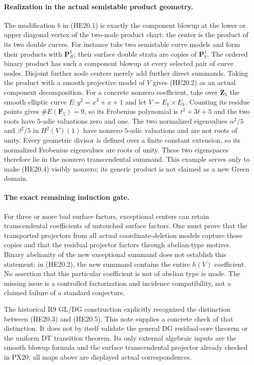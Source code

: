 \paragraph{Realization in the actual semistable product geometry.}
The modification $b$ in (HE20.1) is exactly the component blowup
at the lower or upper diagonal vertex of the two-node product
chart: the center is the product of its two double curves.
For instance take two semistable curve models and form their
products with $\mathbf P^1_R$; their surface double strata
are copies of $\mathbf P^1_k$. The ordered binary product has
such a component blowup at every selected pair of curve nodes.
Disjoint further node centers merely add further direct summands.
Taking the product with a smooth projective model of $V$ gives
(HE20.2) as an actual component decomposition. For a concrete
nonzero coefficient, take over $\mathbf Z_5$ the smooth elliptic
curve $E:y^2=x^3+x+1$ and let $V=E_k\times E_k$. Counting its
residue points gives $\#E(\mathbf F_5)=9$, so its Frobenius
polynomial is $t^2+3t+5$ and the two roots have $5$-adic valuations
zero and one. The two normalized eigenvalues $\alpha^2/5$ and
$\beta^2/5$ in $H^2(V)(1)$ have nonzero $5$-adic valuations and
are not roots of unity. Every geometric divisor is defined over a
finite constant extension, so its normalized Frobenius eigenvalues
are roots of unity. These two eigenspaces therefore lie in the
nonzero transcendental summand. This example serves only to make
(HE20.4) visibly nonzero; its generic product is not claimed as a
new Green domain.

\paragraph{The exact remaining induction gate.}
For three or more bad surface factors, exceptional centers can
retain transcendental coefficients of untouched surface factors.
One must prove that the transported projectors from all actual
coordinate-deletion models capture those copies and that the
residual projector factors through abelian-type motives. Binary
abelianity of the new exceptional summand does not establish this
statement: in (HE20.2), the new summand contains the entire
$h(V)$ coefficient. No assertion that this particular coefficient
is not of abelian type is made. The missing issue is a controlled
factorization and incidence compatibility, not a claimed failure
of a standard conjecture.

The historical R9 GL/DG construction explicitly recognized the
distinction between (HE20.3) and (HE20.5). This note supplies a
concrete check of that distinction. It does not by itself validate
the general DG residual-core theorem or the uniform DT transition
theorem. Its only external algebraic inputs are the smooth blowup
formula and the surface transcendental projector already checked
in PX20; all maps above are displayed actual correspondences.
